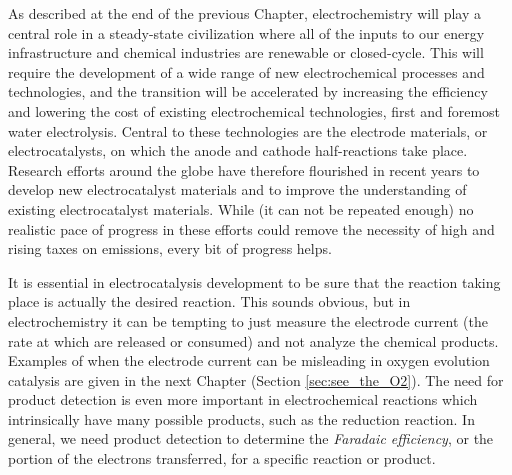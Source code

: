 As described at the end of the previous Chapter, electrochemistry will play a central role in a steady-state civilization where all of the inputs to our energy infrastructure and chemical industries are renewable or closed-cycle. This will require the development of a wide range of new electrochemical processes and technologies, and the transition will be accelerated by increasing the efficiency and lowering the cost of existing electrochemical technologies, first and foremost water electrolysis. Central to these technologies are the electrode materials, or electrocatalysts, on which the anode and cathode half-reactions take place. Research efforts around the globe have therefore flourished in recent years to develop new electrocatalyst materials and to improve the understanding of existing electrocatalyst materials\cite{Lewis2007, Chu2016, Seh2017}. While (it can not be repeated enough) no realistic pace of progress in these efforts could remove the necessity of high and rising taxes on  emissions, every bit of progress helps.

It is essential in electrocatalysis development to be sure that the reaction taking place is actually the desired reaction. This sounds obvious, but in electrochemistry it can be tempting to just measure the electrode current (the rate at which  are released or consumed) and not analyze the chemical products. Examples of when the electrode current can be misleading in oxygen evolution catalysis are given in the next Chapter (Section \ref{sec:see_the_O2}). The need for product detection is even more important in electrochemical reactions which intrinsically have many possible products, such as the  reduction reaction\cite{Nitopi2019}. In general, we need product detection to determine the \textit{Faradaic efficiency}, or the portion of the electrons transferred, for a specific reaction or product.

